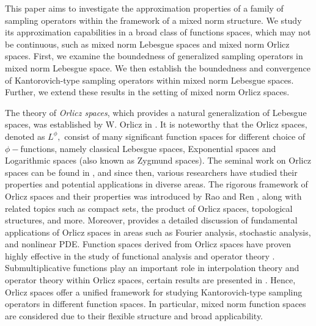 \documentclass[11pt, a4paper]{article}
\theoremstyle{definition}
\numberwithin{equation}{section}
\begin{document}
This paper aims to investigate the approximation properties of a family of sampling operators within the framework of a mixed norm structure. We study its approximation capabilities in a broad class of functions spaces, which may not be continuous, such as mixed norm Lebesgue spaces and mixed norm Orlicz spaces.  First, we examine the boundedness of generalized sampling operators in mixed norm Lebesgue space. We then establish the boundedness and convergence of Kantorovich-type sampling operators within mixed norm Lebesgue spaces. Further, we extend these results in the setting of mixed norm Orlicz spaces.

The theory of \emph{Orlicz spaces}, which provides a natural generalization of Lebesgue spaces, was established by W. Orlicz in \cite{or}. It is noteworthy that the Orlicz spaces, denoted as $L^{\phi},$ consist of many significant function spaces for different choice of $\phi-$functions, namely classical Lebesgue spaces, Exponential spaces and Logarithmic spaces (also known as Zygmund spaces).
The seminal work on Orlicz spaces can be found in \cite{orlicz,1}, and since then, various researchers have studied their properties and potential applications in diverse areas. The rigorous framework of Orlicz spaces and their properties was introduced by Rao and Ren \cite{Raobook}, along with related topics such as compact sets, the product of Orlicz spaces, topological structures, and more.  Moreover, \cite{orliczapp} provides a detailed discussion of fundamental applications of Orlicz spaces in areas such as Fourier analysis, stochastic analysis, and nonlinear PDE.  Function spaces derived from Orlicz spaces have proven highly effective in the study of functional analysis and operator theory \cite{sob, kita}. Submultiplicative functions play an important role in interpolation theory and operator theory within Orlicz spaces, certain results are presented in \cite{2}. Hence, Orlicz spaces offer a unified framework for studying Kantorovich-type sampling operators in different function spaces. In particular, mixed norm function spaces are considered due to their flexible structure and broad applicability.
\end{document}
